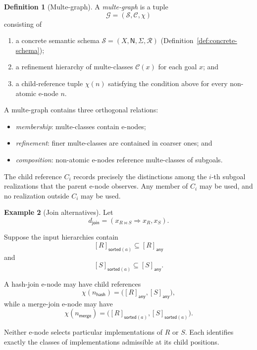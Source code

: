 \documentclass[sigconf,nonacm]{acmart}
\theoremstyle{definition}
\newtheorem{definition}{Definition}[section]
\newtheorem{example}[definition]{Example}
\theoremstyle{plain}
\theoremstyle{remark}
\begin{document}
\begin{definition}[Multe-graph]
A \emph{multe-graph} is a tuple
\[
\mathcal G=(\mathcal S,\mathcal C,\chi)
\]
consisting of

\begin{enumerate}

\item
a concrete semantic schema
\(\mathcal S=(X,\mathsf N,\Sigma,\mathcal R)\)
(Definition~\ref{def:concrete-schema});

\item
a refinement hierarchy of multe-classes
\(\mathcal C(x)\) for each goal \(x\); and

\item
a child-reference tuple \(\chi(n)\) satisfying the condition above for
every non-atomic e-node \(n\).

\end{enumerate}
\end{definition}

A multe-graph contains three orthogonal relations:

\begin{itemize}

\item
\emph{membership}: multe-classes contain e-nodes;

\item
\emph{refinement}: finer multe-classes are contained in coarser ones;
and

\item
\emph{composition}: non-atomic e-nodes reference multe-classes of
subgoals.

\end{itemize}

The child reference \(C_i\) records precisely the distinctions among
the \(i\)-th subgoal realizations that the parent e-node observes.
Any member of \(C_i\) may be used, and no realization outside \(C_i\)
may be used.

\begin{example}[Join alternatives]
Let
\[
d_{\mathsf{join}}
=
(x_{R\Join S}\Rightarrow x_R,x_S).
\]

Suppose the input hierarchies contain
\[
[R]_{\mathsf{sorted}(a)}
\subseteq
[R]_{\mathsf{any}}
\]
and
\[
[S]_{\mathsf{sorted}(a)}
\subseteq
[S]_{\mathsf{any}}.
\]

A hash-join e-node may have child references
\[
\chi(n_{\mathsf{hash}})
=
\bigl(
[R]_{\mathsf{any}},
[S]_{\mathsf{any}}
\bigr),
\]
while a merge-join e-node may have
\[
\chi(n_{\mathsf{merge}})
=
\bigl(
[R]_{\mathsf{sorted}(a)},
[S]_{\mathsf{sorted}(a)}
\bigr).
\]

Neither e-node selects particular implementations of \(R\) or \(S\).
Each identifies exactly the classes of implementations admissible at
its child positions.
\end{example}
\end{document}
